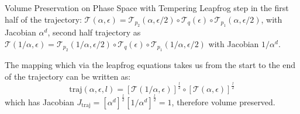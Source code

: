 \documentclass{beamer}
\begin{document}
\begin{frame}[t,allowframebreaks]{Volume Preservation on Phase Space with Tempering}
Leapfrog step in the first half of the trajectory: $\mathcal{T}\left(\alpha,\epsilon\right) = \mathcal{T}_{p_2}\left(\alpha,\epsilon/2\right)\circ\mathcal{T}_q\left(\epsilon\right)\circ\mathcal{T}_{p_1}\left(\alpha,\epsilon/2\right)$, with Jacobian $ \alpha^d $, second half trajectory as $\mathcal{T}\left(1/\alpha,\epsilon\right) = \mathcal{T}_{p_2}\left(1/\alpha,\epsilon/2\right)\circ\mathcal{T}_q\left(\epsilon\right)\circ\mathcal{T}_{p_1}\left(1/\alpha,\epsilon/2\right)$ with Jacobian $1/\alpha^{d}$. 

The mapping which via the leapfrog equations takes us from the start to the end of the trajectory can be written as:
    \begin{equation*}
        \text{traj}\left(\alpha,\epsilon,l\right)=\left[\mathcal{T}\left(1/\alpha,\epsilon\right)\right]^{\frac{l}{2}}\circ\left[\mathcal{T}\left(\alpha,\epsilon\right)\right]^{\frac{l}{2}}
    \end{equation*}
    which has Jacobian $J_{\text{traj}}=\left[\alpha^d\right]^{\frac{l}{2}}\left[1/\alpha^d\right]^{\frac{l}{2}} = 1$, therefore volume preserved.

\end{frame}
\end{document}
